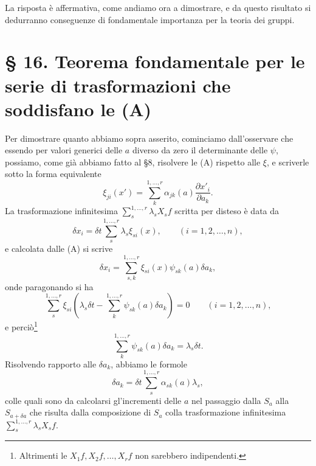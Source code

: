\documentclass[11pt]{book}
\begin{document}
La risposta è affermativa, come andiamo ora a dimostrare, e da questo risultato si dedurranno conseguenze di fondamentale importanza per la teoria dei gruppi.

\section*{\S{} 16. Teorema fondamentale per le serie di trasformazioni che soddisfano le (A)}

Per dimostrare quanto abbiamo sopra asserito, cominciamo dall'osservare che essendo per valori generici delle $a$ diverso da zero il determinante delle $\psi$, possiamo, come già abbiamo fatto al \S{}8, risolvere le (A) rispetto alle $\xi$, e scriverle sotto la forma equivalente
\begin{equation*}\tag{B}
 \xi_{ji}(x')=\sum\limits_k^{1,\ldots,r}\alpha_{jk}(a)\frac{\partial x'_i}{\partial a_k}.
\end{equation*}
La trasformazione infinitesima $\sum\limits_s^{1,\ldots,r}\lambda_sX_sf$ scritta per disteso è data da
\[
 \delta x_i=\delta t\sum\limits_s^{1,\ldots,r}\lambda_s\xi_{si}(x),\qquad (i=1,2,\ldots,n),
\]
e calcolata dalle (A) si scrive
\[
 \delta x_i=\sum\limits_{s,k}^{1,\ldots,r}\xi_{si}(x)\psi_{sk}(a)\delta a_k,
\]
onde paragonando si ha
\[
 \sum\limits_s^{1,\ldots,r}\xi_{si}\left(\lambda_s\delta t-\sum\limits_k^{1,\ldots,r}\psi_{sk}(a)\delta a_k\right)=0
 \qquad(i=1,2,\ldots,n),
\]
e perciò\footnote{Altrimenti le $X_1f,X_2f,\ldots,X_rf$ non sarebbero indipendenti.}
\[
 \sum\limits_k^{1,\ldots,r}\psi_{sk}(a)\delta a_k=\lambda_s\delta t.
\]
Risolvendo rapporto alle $\delta a_k$, abbiamo le formole
\begin{equation*}\tag{c}
 \delta a_k=\delta t\sum\limits_s^{1,\ldots,r}\alpha_{sk}(a)\lambda_s,
\end{equation*}
colle quali sono da calcolarsi gl'incrementi delle $a$ nel passaggio dalla $S_a$ alla $S_{a+\delta a}$ che risulta dalla composizione di $S_a$ colla trasformazione infinitesima $\sum\limits_s^{1,\ldots,r}\lambda_sX_sf$.
\end{document}
